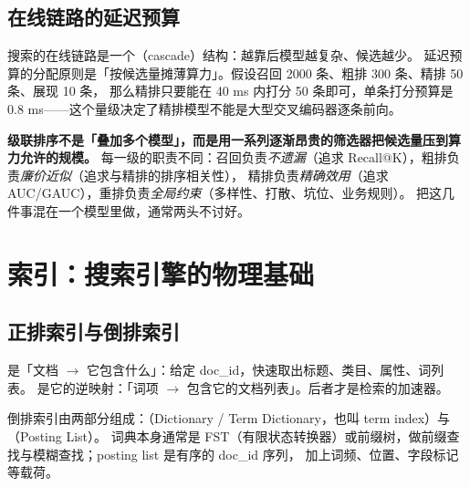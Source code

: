 \subsection{在线链路的延迟预算}

搜索的在线链路是一个（cascade）结构：越靠后模型越复杂、候选越少。
延迟预算的分配原则是「按候选量摊薄算力」。假设召回 2000 条、粗排 300 条、精排 50 条、展现 10 条，
那么精排只要能在 40 ms 内打分 50 条即可，单条打分预算是 0.8 ms——这个量级决定了精排模型不能是大型交叉编码器逐条前向。

\begin{keypoint}[级联的本质是「漏斗 + 早停」]
\textbf{级联排序不是「叠加多个模型」，而是用一系列逐渐昂贵的筛选器把候选量压到算力允许的规模。}
每一级的职责不同：召回负责\emph{不遗漏}（追求 Recall@K），粗排负责\emph{廉价近似}（追求与精排的排序相关性），
精排负责\emph{精确效用}（追求 AUC/GAUC），重排负责\emph{全局约束}（多样性、打散、坑位、业务规则）。
把这几件事混在一个模型里做，通常两头不讨好。
\end{keypoint}

\section{索引：搜索引擎的物理基础}
\label{sec:search-index}

\subsection{正排索引与倒排索引}

 是「文档 $\to$ 它包含什么」：给定 doc\_id，快速取出标题、类目、属性、词列表。
 是它的逆映射：「词项 $\to$ 包含它的文档列表」。后者才是检索的加速器。

倒排索引由两部分组成：（Dictionary / Term Dictionary，也叫 term index）与（Posting List）。
词典本身通常是 FST（有限状态转换器）或前缀树，做前缀查找与模糊查找；posting list 是有序的 doc\_id 序列，
加上词频、位置、字段标记等载荷。

